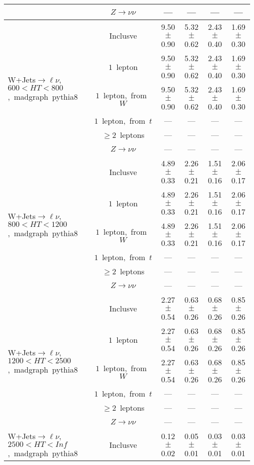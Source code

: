 \documentclass{article}
\begin{document}
\begin{longtable}{|l|c|c|c|c|c|}
 & $Z\rightarrow\nu\nu$  & ---  & ---  & ---  & --- \\* 
\hline 
\multirow{6}{*}{W+Jets$\rightarrow\ell\nu$,~$600<HT<800$,~madgraph~pythia8} & Inclusve  & 9.50 $\pm$ 0.90  & 5.32 $\pm$ 0.62  & 2.43 $\pm$ 0.40  & 1.69 $\pm$ 0.30 \\* 
 & $1$~lepton  & 9.50 $\pm$ 0.90  & 5.32 $\pm$ 0.62  & 2.43 $\pm$ 0.40  & 1.69 $\pm$ 0.30 \\* 
 & $1$~lepton,~from~$W$  & 9.50 $\pm$ 0.90  & 5.32 $\pm$ 0.62  & 2.43 $\pm$ 0.40  & 1.69 $\pm$ 0.30 \\* 
 & $1$~lepton,~from~$t$  & ---  & ---  & ---  & --- \\* 
 & $\ge2$~leptons  & ---  & ---  & ---  & --- \\* 
 & $Z\rightarrow\nu\nu$  & ---  & ---  & ---  & --- \\* 
\hline 
\multirow{6}{*}{W+Jets$\rightarrow\ell\nu$,~$800<HT<1200$,~madgraph~pythia8} & Inclusve  & 4.89 $\pm$ 0.33  & 2.26 $\pm$ 0.21  & 1.51 $\pm$ 0.16  & 2.06 $\pm$ 0.17 \\* 
 & $1$~lepton  & 4.89 $\pm$ 0.33  & 2.26 $\pm$ 0.21  & 1.51 $\pm$ 0.16  & 2.06 $\pm$ 0.17 \\* 
 & $1$~lepton,~from~$W$  & 4.89 $\pm$ 0.33  & 2.26 $\pm$ 0.21  & 1.51 $\pm$ 0.16  & 2.06 $\pm$ 0.17 \\* 
 & $1$~lepton,~from~$t$  & ---  & ---  & ---  & --- \\* 
 & $\ge2$~leptons  & ---  & ---  & ---  & --- \\* 
 & $Z\rightarrow\nu\nu$  & ---  & ---  & ---  & --- \\* 
\hline 
\multirow{6}{*}{W+Jets$\rightarrow\ell\nu$,~$1200<HT<2500$,~madgraph~pythia8} & Inclusve  & 2.27 $\pm$ 0.54  & 0.63 $\pm$ 0.26  & 0.68 $\pm$ 0.26  & 0.85 $\pm$ 0.26 \\* 
 & $1$~lepton  & 2.27 $\pm$ 0.54  & 0.63 $\pm$ 0.26  & 0.68 $\pm$ 0.26  & 0.85 $\pm$ 0.26 \\* 
 & $1$~lepton,~from~$W$  & 2.27 $\pm$ 0.54  & 0.63 $\pm$ 0.26  & 0.68 $\pm$ 0.26  & 0.85 $\pm$ 0.26 \\* 
 & $1$~lepton,~from~$t$  & ---  & ---  & ---  & --- \\* 
 & $\ge2$~leptons  & ---  & ---  & ---  & --- \\* 
 & $Z\rightarrow\nu\nu$  & ---  & ---  & ---  & --- \\* 
\hline 
\multirow{6}{*}{W+Jets$\rightarrow\ell\nu$,~$2500<HT<Inf$,~madgraph~pythia8} & Inclusve  & 0.12 $\pm$ 0.02  & 0.05 $\pm$ 0.01  & 0.03 $\pm$ 0.01  & 0.03 $\pm$ 0.01 \\* 

\end{longtable}
\end{document}
